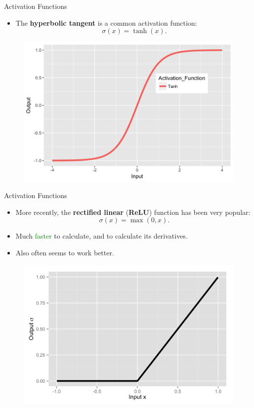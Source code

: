 \documentclass[usenames,dvipsnames,notes,11pt,aspectratio=169]{beamer}
\begin{document}
\begin{frame}{Activation Functions}

\begin{itemize}
\item The \textbf{hyperbolic tangent} is a common activation function:
\[
\sigma(x)=\tanh\left(x\right).
\]
\end{itemize}
\begin{figure}
\includegraphics[height=0.55\textheight]{figures/activationFn-Tanh}
\end{figure}
\end{frame}
%
\begin{frame}{Activation Functions}
\begin{itemize}
\item More recently, the \textbf{rectified linear} (\textbf{ReLU}) function has been very
popular:
\[
\sigma(x)=\max(0,x).
\]
\item Much \textcolor{Green}{faster} to calculate, and to calculate
its derivatives.
\item Also often seems to work better.
\end{itemize}
\begin{figure}
\includegraphics[height=0.55\textheight]{figures/activationFn-Rectified_Linear} 
\end{figure}
\end{frame}
\end{document}
